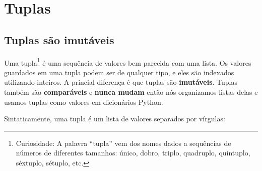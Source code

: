 
\chapter{Tuplas}
\label{tuplechap}

\section{Tuplas são imutáveis}


Uma tupla\footnote{Curiosidade: A palavra ``tupla'' vem dos nomes dados a
sequências de números de diferentes tamanhos: único, dobro, triplo, quadruplo,
quíntuplo, séxtuplo, sétuplo, etc.} é uma sequência de valores bem parecida
com uma lista. Os valores guardados em uma tupla podem ser de qualquer tipo,
e eles são indexados utilizando inteiros. A princial diferença é que tuplas
são {\bf imutáveis}. Tuplas também são {\bf comparáveis} e {\bf nunca mudam}
então nós organizamos listas delas e usamos tuplas como valores em dicionários
Python.


Sintaticamente, uma tupla é um lista de valores separados por vírgulas:

